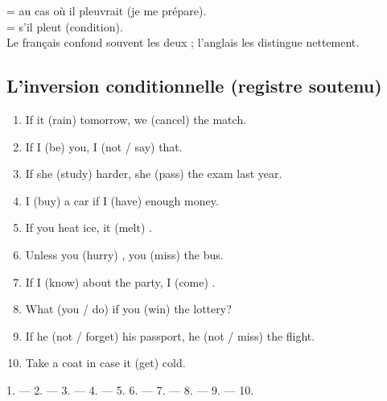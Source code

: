 \begin{piege}
 = au cas où il pleuvrait (je me prépare).\\
 = s'il pleut (condition).\\
Le français confond souvent les deux ; l'anglais les distingue nettement.
\end{piege}

\subsection{L'inversion conditionnelle (registre soutenu)}

\begin{exo}
\begin{enumerate}
  \item If it (rain) \trou[2cm] tomorrow, we (cancel) \trou[2.5cm] the match.
  \item If I (be) \trou[2cm] you, I (not / say) \trou[2.5cm] that.
  \item If she (study) \trou[2.5cm] harder, she (pass) \trou[2.5cm] the exam last year.
  \item I (buy) \trou[2cm] a car if I (have) \trou[2cm] enough money.
  \item If you heat ice, it (melt) \trou[2cm].
  \item Unless you (hurry) \trou[2cm], you (miss) \trou[2cm] the bus.
  \item If I (know) \trou[2.5cm] about the party, I (come) \trou[2.5cm].
  \item What (you / do) \trou[2.5cm] if you (win) \trou[2cm] the lottery?
  \item If he (not / forget) \trou[2.5cm] his passport, he (not / miss) \trou[2.5cm] the flight.
  \item Take a coat in case it (get) \trou[2cm] cold.
\end{enumerate}
\end{exo}
\begin{corrige}[2.1]
1.  ---  2.  --- 
3.  ---  4.  --- 
5.  6.  ---  7.  --- 
8.  ---  9.  --- 
10. 
\end{corrige}

